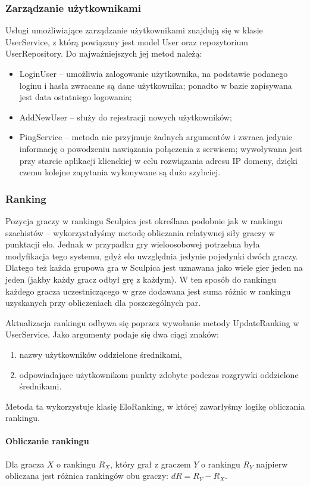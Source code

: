 \subsubsection{Zarządzanie użytkownikami}
Usługi umożliwiające zarządzanie użytkownikami znajdują się w klasie UserService, z którą powiązany jest model User oraz repozytorium UserRepository. Do najważniejszych jej metod należą:
\begin{itemize}
\item LoginUser – umożliwia zalogowanie użytkownika, na podstawie podanego loginu i hasła zwracane są dane użytkownika; ponadto w bazie zapisywana jest data ostatniego logowania;
\item AddNewUser – służy do rejestracji nowych użytkowników;
\item PingService – metoda nie przyjmuje żadnych argumentów i zwraca jedynie informację o powodzeniu nawiązania połączenia z serwisem; wywoływana jest przy starcie aplikacji klienckiej w celu rozwiązania adresu IP domeny, dzięki czemu kolejne zapytania wykonywane są dużo szybciej.
\end{itemize}

\subsubsection{Ranking}
Pozycja graczy w rankingu Sculpica jest określana podobnie jak w rankingu szachistów – wykorzystałyśmy metodę obliczania relatywnej siły graczy w punktacji elo. Jednak w przypadku gry wieloosobowej potrzebna była modyfikacja tego systemu, gdyż elo uwzględnia jedynie pojedynki dwóch graczy. Dlatego też każda grupowa gra w Sculpica jest uznawana jako wiele gier jeden na jeden (jakby każdy gracz odbył grę z każdym). W ten sposób do rankingu każdego gracza uczestniczącego w grze dodawana jest suma różnic w rankingu uzyskanych przy obliczeniach dla poszczególnych par.

Aktualizacja rankingu odbywa się poprzez wywołanie metody UpdateRanking w UserService. Jako argumenty podaje się dwa ciągi znaków:
\begin{enumerate}
    \item nazwy użytkowników oddzielone średnikami,
    \item odpowiadające użytkownikom punkty zdobyte podczas rozgrywki oddzielone średnikami.
\end{enumerate}
Metoda ta wykorzystuje klasię EloRanking, w której zawarłyśmy logikę obliczania rankingu.

\paragraph{Obliczanie rankingu}
Dla gracza $X$ o rankingu $R_X$, który grał z graczem $Y$ o rankingu $R_Y$ najpierw obliczana jest różnica rankingów obu graczy:
$dR=R_Y-R_X$.

